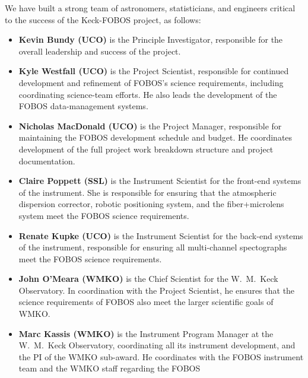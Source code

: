 \documentclass[oneside,11pt]{amsart}
\begin{document}

\begin{center}
\end{center}

\smallskip

\noindent We have built a strong team of astronomers, statisticians,
and engineers critical to the success of the Keck-FOBOS project, as
follows:
%
\begin{itemize}
%
\item {\bf Kevin Bundy (UCO)} is the Principle Investigator, responsible
for the overall leadership and success of the project.\\[-5pt]
%
\item {\bf Kyle Westfall (UCO)} is the Project Scientist, responsible
for continued development and refinement of FOBOS's science
requirements, including coordinating science-team efforts.  He also
leads the development of the FOBOS data-management systems.\\[-5pt]
%
\item {\bf Nicholas MacDonald (UCO)} is the Project Manager,
responsible for maintaining the FOBOS development schedule and
budget. He coordinates development of the full project work breakdown
structure and project documentation.\\[-5pt]
%
\item {\bf Claire Poppett (SSL)} is the Instrument Scientist for the
front-end systems of the instrument. She is responsible for ensuring
that the atmospheric dispersion corrector, robotic positioning
system, and the fiber+microlens system meet the FOBOS science
requirements.\\[-5pt]
%
\item {\bf Renate Kupke (UCO)} is the Instrument Scientist for the
back-end systems of the instrument, responsible for ensuring all
multi-channel spectographs meet the FOBOS science
requirements.\\[-5pt]
%
\item {\bf John O'Meara (WMKO)} is the Chief Scientist for the
W.~M.~Keck Observatory. In coordination with the Project Scientist,
he ensures that the science requirements of FOBOS also meet the
larger scientific goals of WMKO.\\[-5pt]
%
\item {\bf Marc Kassis (WMKO)} is the Instrument Program Manager at
the W.~M.~Keck Observatory, coordinating all its instrument
development, and the PI of the WMKO sub-award. He coordinates
with the FOBOS instrument team and the WMKO staff regarding the FOBOS

\end{itemize}
\end{document}

